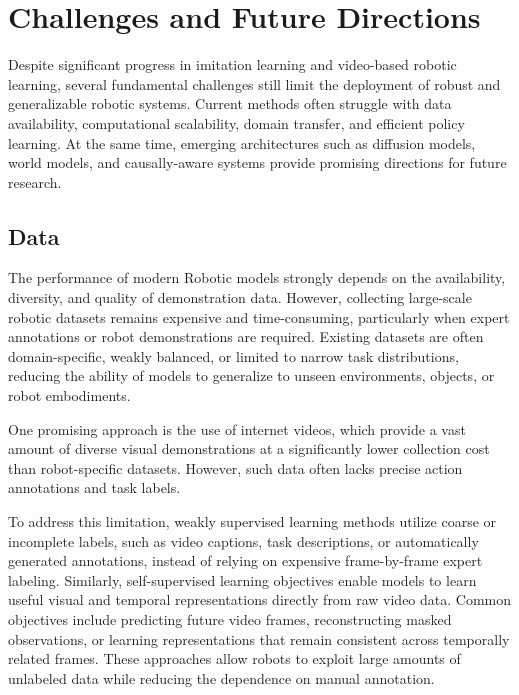 \chapter{Challenges and Future Directions}

Despite significant progress in imitation learning and video-based robotic learning, several fundamental challenges still limit the deployment of robust and generalizable robotic systems. Current methods often struggle with data availability, computational scalability, domain transfer, and efficient policy learning. At the same time, emerging architectures such as diffusion models, world models, and causally-aware systems provide promising directions for future research.


\section{Data}

The performance of modern Robotic models strongly depends on the availability, diversity, and quality of demonstration data. However, collecting large-scale robotic datasets remains expensive and time-consuming, particularly when expert annotations or robot demonstrations are required. Existing datasets are often domain-specific, weakly balanced, or limited to narrow task distributions, reducing the ability of models to generalize to unseen environments, objects, or robot embodiments.

One promising approach is the use of internet videos, which provide a vast amount of diverse visual demonstrations at a significantly lower collection cost than robot-specific datasets. However, such data often lacks precise action annotations and task labels.

To address this limitation, weakly supervised learning methods utilize coarse or incomplete labels, such as video captions, task descriptions, or automatically generated annotations, instead of relying on expensive frame-by-frame expert labeling. Similarly, self-supervised learning objectives enable models to learn useful visual and temporal representations directly from raw video data. Common objectives include predicting future video frames, reconstructing masked observations, or learning representations that remain consistent across temporally related frames. These approaches allow robots to exploit large amounts of unlabeled data while reducing the dependence on manual annotation.

